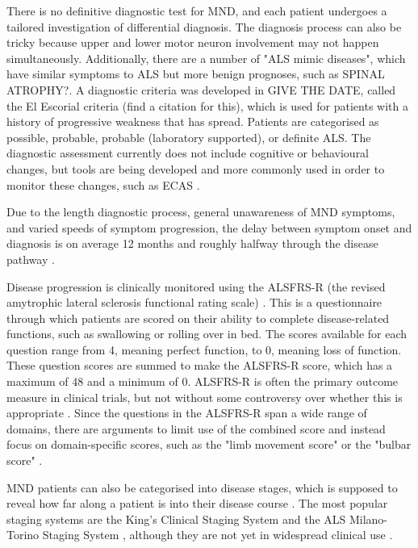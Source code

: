 There is no definitive diagnostic test for MND, and each patient undergoes a tailored investigation of differential diagnosis. The diagnosis process can also be tricky because upper and lower motor neuron involvement may not happen simultaneously. Additionally, there are a number of "ALS mimic diseases", which have similar symptoms to ALS but more benign prognoses, such as SPINAL ATROPHY?. A diagnostic criteria was developed in GIVE THE DATE, called the El Escorial criteria (find a citation for this), which is used for patients with a history of progressive weakness that has spread. Patients are categorised as possible, probable, probable (laboratory supported), or definite ALS.
The diagnostic assessment currently does not include cognitive or behavioural changes, but tools are being developed and more commonly used in order to monitor these changes, such as ECAS \cite{abrahamsScreeningCognitionBehaviour2014}.

Due to the length diagnostic process, general unawareness of MND symptoms, and varied speeds of symptom progression, the delay between symptom onset and diagnosis is on average 12 months and roughly halfway through the disease pathway \cite{mitchellTimelinesDiagnosticEvaluation2010}.

Disease progression is clinically monitored using the ALSFRS-R (the revised amytrophic lateral sclerosis functional rating scale) \cite{cedarbaumALSFRSRRevisedALS1999}. This is a questionnaire through which patients are scored on their ability to complete disease-related functions, such as swallowing or rolling over in bed. The scores available for each question range from 4, meaning perfect function, to 0, meaning loss of function. These question scores are summed to make the ALSFRS-R score, which has a maximum of 48 and a minimum of 0. ALSFRS-R is often the primary outcome measure in clinical trials, but not without some controversy over whether this is appropriate \cite{vaneijkOldFriendWho2021}. Since the questions in the ALSFRS-R span a wide range of domains, there are arguments to limit use of the combined score and instead focus on domain-specific scores, such as the "limb movement score" or the "bulbar score" \cite{rooneyWhatDoesALSFRSR2017}.

MND patients can also be categorised into disease stages, which is supposed to reveal how far along a patient is into their disease course \cite{feldmanAmyotrophicLateralSclerosis2022}. The most popular staging systems are the King's Clinical Staging System \cite{rocheProposedStagingSystem2012} and the ALS Milano-Torino Staging System \cite{chioDevelopmentEvaluationClinical2015}, although they are not yet in widespread clinical use \cite{fangComparisonKingMiToS2017}.

